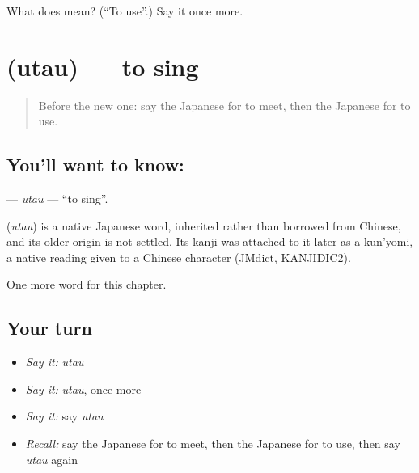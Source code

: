 \begin{tcolorbox}[breakable,colback=teal!4,colframe=teal!35!black,title={Before you move on}]
What does  mean? (\textquotedblleft{}To use\textquotedblright{}.) Say it once more.
\end{tcolorbox}
\section[\texorpdfstring{\ja{うたう} (utau)}{うたう (utau)}]{ (utau) — to sing}

\label{lesson:JA-C28-utau}



\begin{quote}
Before the new one: say the Japanese for to meet, then the Japanese for to use.
\end{quote}

\subsection*{You'll want to know: }
\textbf{} — \emph{utau} — \textquotedblleft{}to sing\textquotedblright{}.

\begin{cousinweb}
\textbf{} (\emph{utau}) is a native Japanese word, inherited rather than borrowed from Chinese, and its older origin is not settled. Its kanji was attached to it later as a kun'yomi, a native reading given to a Chinese character (JMdict, KANJIDIC2).
\end{cousinweb}

\begin{grammarlens}[title={What you've built}]
One more word for this chapter.
\end{grammarlens}

\subsection*{Your turn}
\begin{itemize}
\raggedright
  \item \emph{Say it:} \emph{utau}
  \item \emph{Say it:} \emph{utau}, once more
  \item \emph{Say it:} say \emph{utau}
  \item \emph{Recall:} say the Japanese for to meet, then the Japanese for to use, then say \emph{utau} again
\end{itemize}

